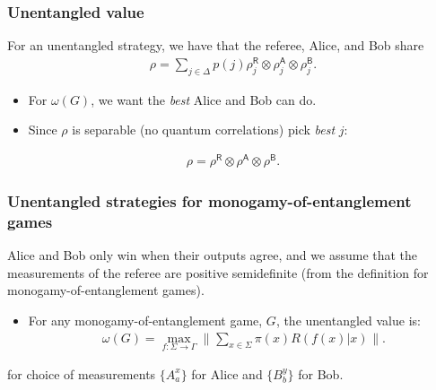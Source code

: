 \documentclass{beamer}
\newcommand{\tinyspace}{\mspace{1mu}}
\newcommand{\biggnorm}[1]{\biggl\lVert\tinyspace #1 \tinyspace\biggr\rVert}
\newcommand{\reg}[1]{\mathsf{#1}}
\begin{document}
\begin{frame}
	\frametitle{Unentangled value}
	For an unentangled strategy, we have that the referee, Alice, and Bob share
	\begin{align*}
		\rho = \sum_{j \in \Delta} p(j) \rho_j^{\reg{R}} \otimes \rho_j^{\reg{A}} \otimes \rho_j^{\reg{B}}.
	\end{align*}
	\begin{itemize}
		\item For $\omega(G)$, we want the \emph{best} Alice and Bob can do. 
		\item Since $\rho$ is separable (no quantum correlations) pick \emph{best} $j$:
	\end{itemize}
	\begin{align*}
		\rho = \rho^{\reg{R}} \otimes \rho^{\reg{A}} \otimes \rho^{\reg{B}}.
	\end{align*}
\end{frame}

\begin{frame}
	\frametitle{Unentangled strategies for monogamy-of-entanglement games}
Alice and Bob only win when their outputs agree, and we assume that the measurements of the referee are positive semidefinite (from the definition for monogamy-of-entanglement games). 	
	\begin{itemize}
	\item For any monogamy-of-entanglement game, $G$, the unentangled value is:
	\begin{align*}
		\omega(G) = \max_{f: \Sigma \rightarrow \Gamma} \biggnorm{\sum_{x \in \Sigma} \pi(x) R(f(x)|x) }.
	\end{align*}	
	\end{itemize}  
	for choice of measurements $\{A_a^x\}$ for Alice and $\{B_b^y\}$ for Bob. 
\end{frame}
\end{document}
